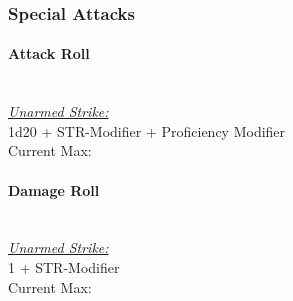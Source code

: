 \documentclass[letterpaper,openany,oneside,twocolumn]{book}
\begin{document}
\subsubsection*{Special Attacks}
\paragraph*{Attack Roll}\hfill\\
\underline{\textit{Unarmed Strike:}}\\
1d20 + STR-Modifier + Proficiency Modifier\\
\indent Current Max: 
\paragraph*{Damage Roll}\hfill\\
\underline{\textit{Unarmed Strike:}}\\
1 + STR-Modifier\\
\indent Current Max: 
\end{document}

